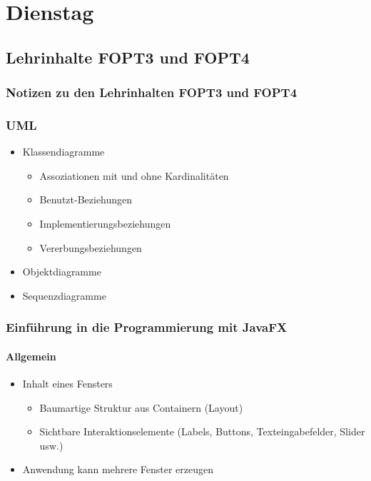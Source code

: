 \section{Dienstag}

\subsection{Lehrinhalte FOPT3 und FOPT4}

\subsubsection{Notizen zu den Lehrinhalten FOPT3 und FOPT4}

\subsubsection*{UML}
\begin{itemize}
    \item Klassendiagramme
    \begin{itemize}
        \item Assoziationen mit und ohne Kardinalitäten
        \item Benutzt-Beziehungen
        \item Implementierungsbeziehungen
        \item Vererbungsbeziehungen
    \end{itemize}
    \item Objektdiagramme
    \item Sequenzdiagramme
\end{itemize}

\subsubsection*{Einführung in die Programmierung mit JavaFX}

\paragraph*{Allgemein}

\begin{itemize}
    \item Inhalt eines Fensters
    \begin{itemize}
        \item Baumartige Struktur aus Containern (Layout)
        \item Sichtbare Interaktionselemente (Labels, Buttons, Texteingabefelder, Slider usw.)
    \end{itemize}
    \item Anwendung kann mehrere Fenster erzeugen
\end{itemize}

